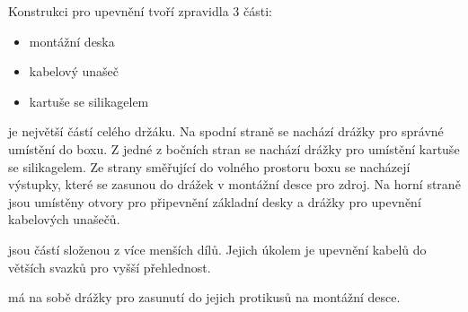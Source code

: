 Konstrukci pro upevnění tvoří zpravidla 3 části:
\begin{itemize}
    \item montážní deska
    \item kabelový unašeč
    \item kartuše se silikagelem
\end{itemize}

\noindent{} je největší částí celého držáku. 
Na spodní straně se nachází drážky pro správné umístění do boxu.
Z jedné z bočních stran se nachází drážky pro umístění kartuše se silikagelem.
Ze strany směřující do volného prostoru boxu se nacházejí výstupky, které se zasunou do drážek v montážní desce pro zdroj.
Na horní straně jsou umístěny otvory pro připevnění základní desky a drážky pro upevnění kabelových unašečů.

\noindent{} jsou částí složenou z více menších dílů.
Jejich úkolem je upevnění kabelů do větších svazků pro vyšší přehlednost.

\noindent{} má na sobě drážky pro zasunutí do jejich protikusů na montážní desce.


\newpage